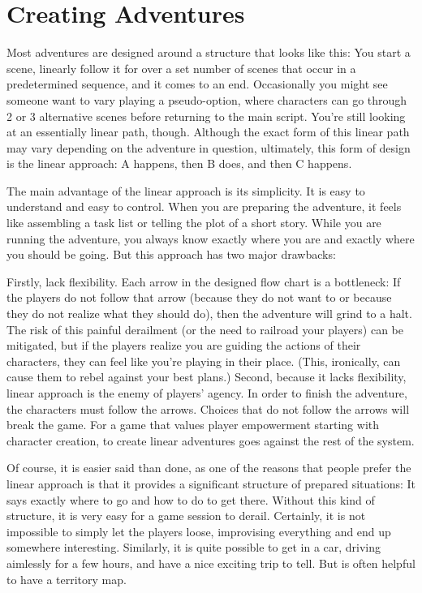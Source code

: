 \section{Creating Adventures}\label{sec:gm-adventures}
\begin{multicols}{2}
Most adventures are designed around a structure that looks like this: You start a scene, linearly follow it for over a set number of scenes that occur in a predetermined sequence, and it comes to an end. Occasionally you might see someone want to vary playing a pseudo-option, where characters can go through 2 or 3 alternative scenes before returning to the main script. You're still looking at an essentially linear path, though. Although the exact form of this linear path may vary depending on the adventure in question, ultimately, this form of design is the linear approach: A happens, then B does, and then C happens.

The main advantage of the linear approach is its simplicity. It is easy to understand and easy to control. When you are preparing the adventure, it feels like assembling a task list or telling the plot of a short story. While you are running the adventure, you always know exactly where you are and exactly where you should be going. But this approach has two major drawbacks:

Firstly, lack flexibility. Each arrow in the designed flow chart is a bottleneck: If the players do not follow that arrow (because they do not want to or because they do not realize what they should do), then the adventure will grind to a halt. The risk of this painful derailment (or the need to railroad your players) can be mitigated, but if the players realize you are guiding the actions of their characters, they can feel like you're playing in their place. (This, ironically, can cause them to rebel against your best plans.) Second, because it lacks flexibility, linear approach is the enemy of players’ agency. In order to finish the adventure, the characters must follow the arrows. Choices that do not follow the arrows will break the game. For a game that values player empowerment starting with character creation, to create linear adventures goes against the rest of the system.

Of course, it is easier said than done, as one of the reasons that people prefer the linear approach is that it provides a significant structure of prepared situations: It says exactly where to go and how to do to get there. Without this kind of structure, it is very easy for a game session to derail. Certainly, it is not impossible to simply let the players loose, improvising everything and end up somewhere interesting. Similarly, it is quite possible to get in a car, driving aimlessly for a few hours, and have a nice exciting trip to tell. But is often helpful to have a territory map.


\end{multicols}
